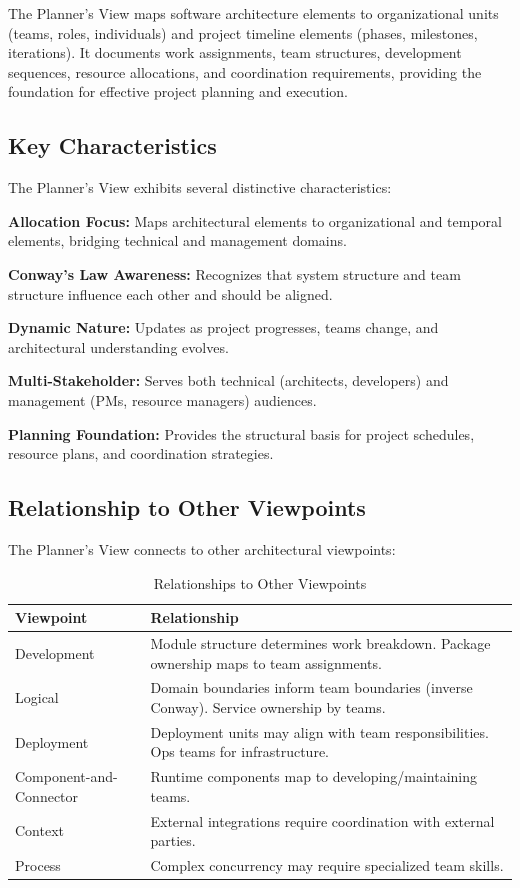\documentclass[11pt,letterpaper]{article}
\begin{document}
\begin{definitionbox}
The Planner's View maps software architecture elements to organizational units (teams, roles, individuals) and project timeline elements (phases, milestones, iterations). It documents work assignments, team structures, development sequences, resource allocations, and coordination requirements, providing the foundation for effective project planning and execution.
\end{definitionbox}

\subsection{Key Characteristics}

The Planner's View exhibits several distinctive characteristics:

\textbf{Allocation Focus:} Maps architectural elements to organizational and temporal elements, bridging technical and management domains.

\textbf{Conway's Law Awareness:} Recognizes that system structure and team structure influence each other and should be aligned.

\textbf{Dynamic Nature:} Updates as project progresses, teams change, and architectural understanding evolves.

\textbf{Multi-Stakeholder:} Serves both technical (architects, developers) and management (PMs, resource managers) audiences.

\textbf{Planning Foundation:} Provides the structural basis for project schedules, resource plans, and coordination strategies.

\subsection{Relationship to Other Viewpoints}

The Planner's View connects to other architectural viewpoints:

\begin{table}[H]
\centering
\caption{Relationships to Other Viewpoints}
\begin{tabular}{@{}L{3.5cm}L{10.5cm}@{}}
\toprule
\textbf{Viewpoint} & \textbf{Relationship} \\
\midrule
Development & Module structure determines work breakdown. Package ownership maps to team assignments. \\
\addlinespace
Logical & Domain boundaries inform team boundaries (inverse Conway). Service ownership by teams. \\
\addlinespace
Deployment & Deployment units may align with team responsibilities. Ops teams for infrastructure. \\
\addlinespace
Component-and-Connector & Runtime components map to developing/maintaining teams. \\
\addlinespace
Context & External integrations require coordination with external parties. \\
\addlinespace
Process & Complex concurrency may require specialized team skills. \\
\bottomrule
\end{tabular}
\end{table}
\end{document}
